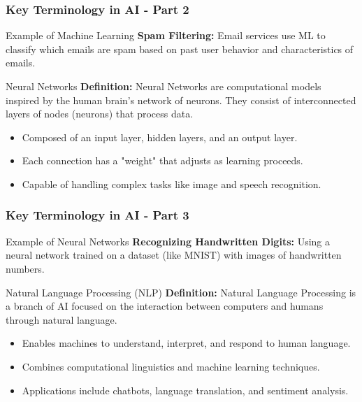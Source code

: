 \documentclass{beamer}
\begin{document}
\begin{frame}[fragile]
    \frametitle{Key Terminology in AI - Part 2}
    \begin{block}{Example of Machine Learning}
        \textbf{Spam Filtering:}  
        Email services use ML to classify which emails are spam based on past user behavior and characteristics of emails.
    \end{block}
    
    \begin{block}{Neural Networks}
        \textbf{Definition:}  
        Neural Networks are computational models inspired by the human brain's network of neurons. They consist of interconnected layers of nodes (neurons) that process data.
    \end{block}
    
    \begin{itemize}
        \item Composed of an input layer, hidden layers, and an output layer.
        \item Each connection has a "weight" that adjusts as learning proceeds.
        \item Capable of handling complex tasks like image and speech recognition.
    \end{itemize}
\end{frame}

\begin{frame}[fragile]
    \frametitle{Key Terminology in AI - Part 3}
    \begin{block}{Example of Neural Networks}
        \textbf{Recognizing Handwritten Digits:}  
        Using a neural network trained on a dataset (like MNIST) with images of handwritten numbers.
    \end{block}
    
    \begin{block}{Natural Language Processing (NLP)}
        \textbf{Definition:}  
        Natural Language Processing is a branch of AI focused on the interaction between computers and humans through natural language.
    \end{block}

    \begin{itemize}
        \item Enables machines to understand, interpret, and respond to human language.
        \item Combines computational linguistics and machine learning techniques.
        \item Applications include chatbots, language translation, and sentiment analysis.
    \end{itemize}
\end{frame}
\end{document}
